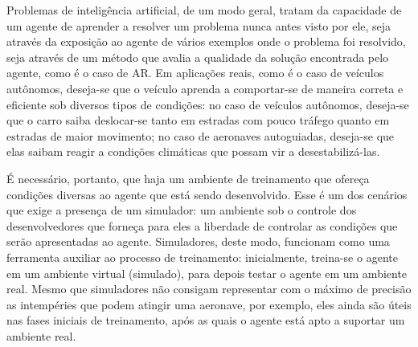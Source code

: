 \documentclass[cic,tc]{iiufrgs}
\begin{document}
%

Problemas de inteligência artificial, de um modo geral, tratam da capacidade de um agente de aprender a resolver um problema nunca antes visto por ele,
seja através da exposição ao agente de vários exemplos onde o problema foi resolvido, seja através de um método que avalia a qualidade da
solução encontrada pelo agente, como é o caso de AR. Em aplicações reais, como é o caso de veículos autônomos, deseja-se que o veículo
aprenda a comportar-se de maneira correta e eficiente sob diversos tipos de condições: no caso de veículos autônomos, deseja-se que o carro
saiba deslocar-se tanto em estradas com pouco tráfego quanto em estradas de maior movimento; no caso de aeronaves autoguiadas, deseja-se
que elas saibam reagir a condições climáticas que possam vir a desestabilizá-las.


É necessário, portanto, que haja um ambiente de treinamento que ofereça condições diversas ao agente que está sendo desenvolvido. Esse é um dos
cenários que exige a presença de um simulador: um ambiente sob o controle dos desenvolvedores que forneça para eles a liberdade de controlar
as condições que serão apresentadas ao agente. Simuladores, deste modo, funcionam como uma ferramenta auxiliar ao processo de treinamento: inicialmente,
treina-se o agente em um ambiente virtual (simulado), para depois testar o agente em um ambiente real. Mesmo que simuladores não consigam
representar com o máximo de precisão as intempéries que podem atingir uma aeronave, por exemplo, eles ainda são úteis nas fases iniciais
de treinamento, após as quais o agente está apto a suportar um ambiente real.
\end{document}
